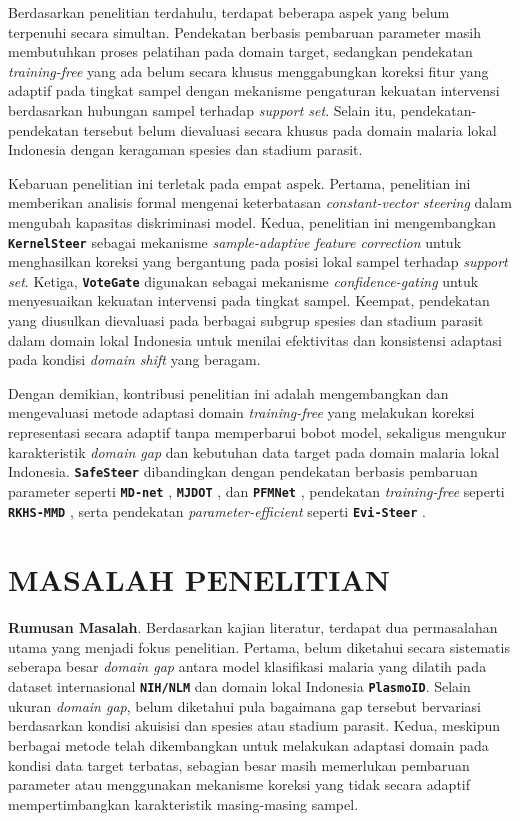 \documentclass[conference]{IEEEtran}
\newcommand{\nama}[1]{\textbf{\texttt{#1}}}
\newcommand{\myparagraph}[1]{\vspace{0.2cm}\noindent\textbf{#1}.}
\begin{document}
Berdasarkan penelitian terdahulu, terdapat beberapa aspek yang belum terpenuhi secara simultan. Pendekatan berbasis pembaruan parameter masih membutuhkan proses pelatihan pada domain target, sedangkan pendekatan \textit{training-free} yang ada belum secara khusus menggabungkan koreksi fitur yang adaptif pada tingkat sampel dengan mekanisme pengaturan kekuatan intervensi berdasarkan hubungan sampel terhadap \textit{support set}. Selain itu, pendekatan-pendekatan tersebut belum dievaluasi secara khusus pada domain malaria lokal Indonesia dengan keragaman spesies dan stadium parasit.

Kebaruan penelitian ini terletak pada empat aspek. Pertama, penelitian ini memberikan analisis formal mengenai keterbatasan \textit{constant-vector steering} dalam mengubah kapasitas diskriminasi model. Kedua, penelitian ini mengembangkan \nama{KernelSteer} sebagai mekanisme \textit{sample-adaptive feature correction} untuk menghasilkan koreksi yang bergantung pada posisi lokal sampel terhadap \textit{support set}. Ketiga, \nama{VoteGate} digunakan sebagai mekanisme \textit{confidence-gating} untuk menyesuaikan kekuatan intervensi pada tingkat sampel. Keempat, pendekatan yang diusulkan dievaluasi pada berbagai subgrup spesies dan stadium parasit dalam domain lokal Indonesia untuk menilai efektivitas dan konsistensi adaptasi pada kondisi \textit{domain shift} yang beragam.

Dengan demikian, kontribusi penelitian ini adalah mengembangkan dan mengevaluasi metode adaptasi domain \textit{training-free} yang melakukan koreksi representasi secara adaptif tanpa memperbarui bobot model, sekaligus mengukur karakteristik \textit{domain gap} dan kebutuhan data target pada domain malaria lokal Indonesia. \nama{SafeSteer} dibandingkan dengan pendekatan berbasis pembaruan parameter seperti \nama{MD-net} \cite{b2}, \nama{MJDOT} \cite{b7}, dan \nama{PFMNet} \cite{b8}, pendekatan \textit{training-free} seperti \nama{RKHS-MMD} \cite{b14}, serta pendekatan \textit{parameter-efficient} seperti \nama{Evi-Steer} \cite{b12}.

\section{MASALAH PENELITIAN}
\label{masalah}
\myparagraph{Rumusan Masalah} Berdasarkan kajian literatur, terdapat dua permasalahan utama yang menjadi fokus penelitian. Pertama, belum diketahui secara sistematis seberapa besar \textit{domain gap} antara model klasifikasi malaria yang dilatih pada dataset internasional \nama{NIH/NLM} dan domain lokal Indonesia \nama{PlasmoID}. Selain ukuran \textit{domain gap}, belum diketahui pula bagaimana gap tersebut bervariasi berdasarkan kondisi akuisisi dan spesies atau stadium parasit.
Kedua, meskipun berbagai metode telah dikembangkan untuk melakukan adaptasi domain pada kondisi data target terbatas, sebagian besar masih memerlukan pembaruan parameter atau menggunakan mekanisme koreksi yang tidak secara adaptif mempertimbangkan karakteristik masing-masing sampel. 
\end{document}
